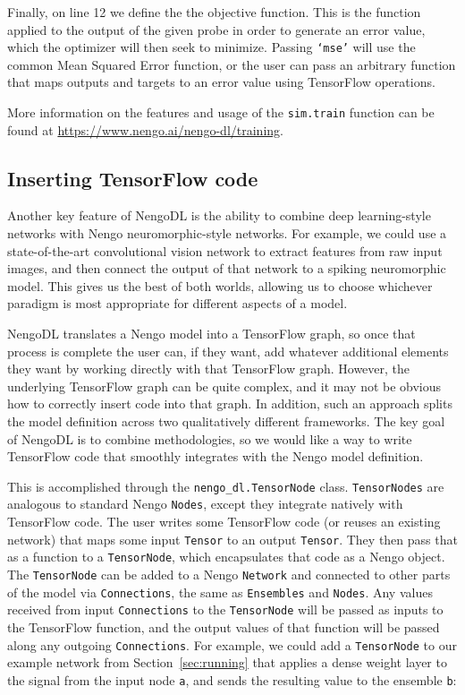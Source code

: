 \documentclass{article}
\begin{document}
Finally, on line 12 we define the the objective function.  This is the function applied to the output of the given probe in order to generate an error value, which the optimizer will then seek to minimize.  Passing \texttt{`mse'} will use the common Mean Squared Error function, or the user can pass an arbitrary function that maps outputs and targets to an error value using TensorFlow operations.

More information on the features and usage of the \texttt{sim.train} function can be found at \url{https://www.nengo.ai/nengo-dl/training}.

\subsection{Inserting TensorFlow code}
\label{sec:tensornode}

Another key feature of NengoDL is the ability to combine deep learning-style networks with Nengo neuromorphic-style networks.  For example, we could use a state-of-the-art convolutional vision network to extract features from raw input images, and then connect the output of that network to a spiking neuromorphic model.  This gives us the best of both worlds, allowing us to choose whichever paradigm is most appropriate for different aspects of a model.

NengoDL translates a Nengo model into a TensorFlow graph, so once that process is complete the user can, if they want, add whatever additional elements they want by working directly with that TensorFlow graph.  However, the underlying TensorFlow graph can be quite complex, and it may not be obvious how to correctly insert code into that graph.  In addition, such an approach splits the model definition across two qualitatively different frameworks.  The key goal of NengoDL is to combine methodologies, so we would like a way to write TensorFlow code that smoothly integrates with the Nengo model definition.

This is accomplished through the \texttt{nengo\_dl.TensorNode} class.  \texttt{TensorNodes} are analogous to standard Nengo \texttt{Nodes}, except they integrate natively with TensorFlow code.  The user writes some TensorFlow code (or reuses an existing network) that maps some input \texttt{Tensor} to an output \texttt{Tensor}.  They then pass that as a function to a \texttt{TensorNode}, which encapsulates that code as a Nengo object.  The \texttt{TensorNode} can be added to a Nengo \texttt{Network} and connected to other parts of the model via \texttt{Connections}, the same as \texttt{Ensembles} and \texttt{Nodes}.  Any values received from input \texttt{Connections} to the \texttt{TensorNode} will be passed as inputs to the TensorFlow function, and the output values of that function will be passed along any outgoing \texttt{Connections}.  For example, we could add a \texttt{TensorNode} to our example network from Section~\ref{sec:running} that applies a dense weight layer to the signal from the input node \texttt{a}, and sends the resulting value to the ensemble \texttt{b}:
\end{document}
